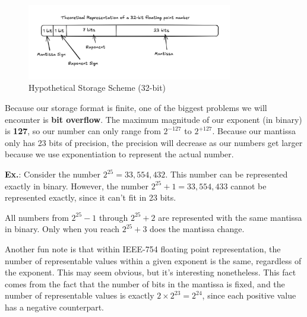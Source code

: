 \documentclass[12pt]{article}
\newcommand{\Ex}{\textbf{Ex.}\xspace}
\begin{document}
\begin{figure}[h]
  \centering
  \includegraphics[width=0.8\textwidth]{./fake_ieee754.png}
  \caption{Hypothetical Storage Scheme (32-bit)}
\end{figure}

Because our storage format is finite, one of the biggest problems we will 
encounter is \textbf{bit overflow}. The maximum magnitude of our exponent 
(in binary) is \textbf{127}, so our number can only range from $2^{-127}$ to
$2^{+127}$. Because our mantissa only has 23 bits of precision, the precision
will decrease as our numbers get larger because we use exponentiation to 
represent the actual number.

\Ex:
Consider the number $2^{25} = 33,554,432$. This number can be represented 
exactly in binary. However, the number $2^{25}+1 = 33,554,433$ cannot be
represented exactly, since it can't fit in 23 bits.

All numbers from $2^{25}-1$ through $2^{25}+2$ are represented with the same
mantissa in binary. Only when you reach $2^{25}+3$ does the mantissa change.

Another fun note is that within IEEE-754 floating point representation, the
number of representable values within a given exponent is the same, regardless
of the exponent. This may seem obvious, but it's interesting nonetheless. This
fact comes from the fact that the number of bits in the mantissa is fixed, and
the number of representable values is exactly $2\times 2^{23} = 2^{24}$, since each
positive value has a negative counterpart.
\end{document}

